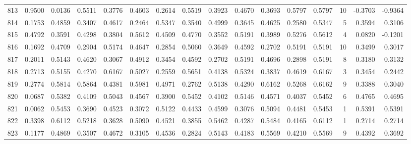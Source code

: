 \begin{tabular}{lrrrrrrrrrrrrrrr}
813 &      0.9500 &  0.0136 &  0.5511 &  0.3776 &  0.4603 &  0.2614 &  0.5519 &  0.3923 &  0.4670 &  0.3693 &   0.5797 &     0.5797 &     10 &                   -0.3703 &                    -0.9364 \\
814 &      0.1753 &  0.4859 &  0.3407 &  0.4617 &  0.2464 &  0.5347 &  0.3540 &  0.4999 &  0.3645 &  0.4625 &   0.2580 &     0.5347 &      5 &                    0.3594 &                     0.3106 \\
815 &      0.4792 &  0.3591 &  0.4298 &  0.3804 &  0.5612 &  0.4509 &  0.4770 &  0.3552 &  0.5191 &  0.3989 &   0.5276 &     0.5612 &      4 &                    0.0820 &                    -0.1201 \\
816 &      0.1692 &  0.4709 &  0.2904 &  0.5174 &  0.4647 &  0.2854 &  0.5060 &  0.3649 &  0.4592 &  0.2702 &   0.5191 &     0.5191 &     10 &                    0.3499 &                     0.3017 \\
817 &      0.2011 &  0.5143 &  0.4620 &  0.3067 &  0.4912 &  0.3454 &  0.4592 &  0.2702 &  0.5191 &  0.4696 &   0.2898 &     0.5191 &      8 &                    0.3180 &                     0.3132 \\
818 &      0.2713 &  0.5155 &  0.4270 &  0.6167 &  0.5027 &  0.2559 &  0.5651 &  0.4138 &  0.5324 &  0.3837 &   0.4619 &     0.6167 &      3 &                    0.3454 &                     0.2442 \\
819 &      0.2774 &  0.5814 &  0.5864 &  0.4381 &  0.5981 &  0.4971 &  0.2762 &  0.5138 &  0.4290 &  0.6162 &   0.5268 &     0.6162 &      9 &                    0.3388 &                     0.3040 \\
820 &      0.0687 &  0.5382 &  0.4109 &  0.5043 &  0.4567 &  0.3900 &  0.5452 &  0.4102 &  0.5146 &  0.4571 &   0.4037 &     0.5452 &      6 &                    0.4765 &                     0.4695 \\
821 &      0.0062 &  0.5453 &  0.3690 &  0.4523 &  0.3072 &  0.5122 &  0.4433 &  0.4599 &  0.3076 &  0.5094 &   0.4481 &     0.5453 &      1 &                    0.5391 &                     0.5391 \\
822 &      0.3398 &  0.6112 &  0.5218 &  0.3628 &  0.5090 &  0.4521 &  0.3855 &  0.5462 &  0.4287 &  0.5484 &   0.4165 &     0.6112 &      1 &                    0.2714 &                     0.2714 \\
823 &      0.1177 &  0.4869 &  0.3507 &  0.4672 &  0.3105 &  0.4536 &  0.2824 &  0.5143 &  0.4183 &  0.5569 &   0.4210 &     0.5569 &      9 &                    0.4392 &                     0.3692 \\

\end{tabular}
